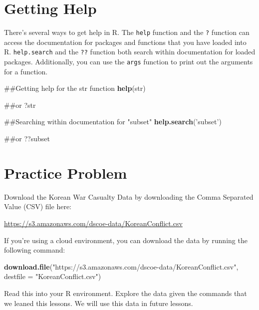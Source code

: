 \documentclass[]{book}
\newenvironment{Shaded}{\begin{snugshade}}{\end{snugshade}}
\newcommand{\KeywordTok}[1]{\textcolor[rgb]{0.13,0.29,0.53}{\textbf{{#1}}}}
\newcommand{\DataTypeTok}[1]{\textcolor[rgb]{0.13,0.29,0.53}{{#1}}}
\newcommand{\StringTok}[1]{\textcolor[rgb]{0.31,0.60,0.02}{{#1}}}
\newcommand{\NormalTok}[1]{{#1}}
\begin{document}
\section{Getting Help}\label{getting-help}

There's several ways to get help in R. The \texttt{help} function and
the \texttt{?} function can access the documentation for packages and
functions that you have loaded into R. \texttt{help.search} and the
\texttt{??} function both search within documentation for loaded
packages. Additionally, you can use the \texttt{args} function to print
out the arguments for a function.

\begin{Shaded}
\begin{Highlighting}[]
\NormalTok{##Getting help for the str function}
\KeywordTok{help}\NormalTok{(str)}

\NormalTok{##or}
\NormalTok{?str}

\NormalTok{##Searching within documentation for "subset"}
\KeywordTok{help.search}\NormalTok{(}\StringTok{'subset'}\NormalTok{)}

\NormalTok{##or}
\NormalTok{??subset}
\end{Highlighting}
\end{Shaded}

\section{Practice Problem}\label{practice-problem}

Download the Korean War Casualty Data by downloading the Comma Separated
Value (CSV) file here:

\url{https://s3.amazonaws.com/dscoe-data/KoreanConflict.csv}

If you're using a cloud environment, you can download the data by
running the following command:

\begin{Shaded}
\begin{Highlighting}[]
\KeywordTok{download.file}\NormalTok{(}\StringTok{"https://s3.amazonaws.com/dscoe-data/KoreanConflict.csv"}\NormalTok{, }\DataTypeTok{destfile =} \StringTok{"KoreanConflict.csv"}\NormalTok{)}
\end{Highlighting}
\end{Shaded}

Read this into your R environment. Explore the data given the commands
that we leaned this lessons. We will use this data in future lessons.
\end{document}
